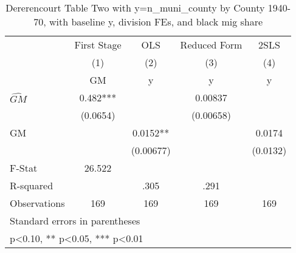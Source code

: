 \begin{table}[htbp]\centering
\def\sym#1{\ifmmode^{#1}\else\(^{#1}\)\fi}
\caption{Dererencourt Table Two with y=n\_muni\_county by County 1940-70, with baseline y, division FEs, and black mig share}
\begin{tabular}{l*{4}{c}}
\toprule
                    & First Stage   &         OLS   &Reduced Form   &        2SLS   \\
                    &\multicolumn{1}{c}{(1)}&\multicolumn{1}{c}{(2)}&\multicolumn{1}{c}{(3)}&\multicolumn{1}{c}{(4)}\\
                    &\multicolumn{1}{c}{GM}&\multicolumn{1}{c}{y}&\multicolumn{1}{c}{y}&\multicolumn{1}{c}{y}\\
\midrule
$\hat{GM}$          &       0.482***&               &     0.00837   &               \\
                    &    (0.0654)   &               &   (0.00658)   &               \\
\addlinespace
GM                  &               &      0.0152** &               &      0.0174   \\
                    &               &   (0.00677)   &               &    (0.0132)   \\
\midrule
F-Stat              &      26.522   &               &               &               \\
R-squared           &               &        .305   &        .291   &               \\
Observations        &         169   &         169   &         169   &         169   \\
\bottomrule
\multicolumn{5}{l}{\footnotesize Standard errors in parentheses}\\
\multicolumn{5}{l}{\footnotesize * p<0.10, ** p<0.05, *** p<0.01}\\
\end{tabular}
\end{table}
